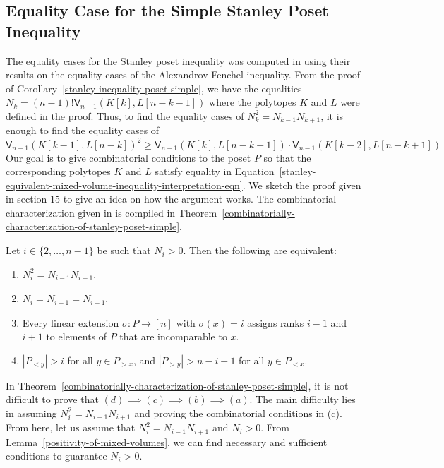 \documentclass{puthesis-UG}
\begin{document}
\subsection{Equality Case for the Simple Stanley Poset Inequality}

The equality cases for the Stanley poset inequality was computed in \cite{shenfeld2022extremals} using their results on the equality cases of the Alexandrov-Fenchel inequality. From the proof of Corollary~\ref{stanley-inequality-poset-simple}, we have the equalities $N_k = (n-1)! \mathsf{V}_{n-1} (K[k], L[n-k-1])$ where the polytopes $K$ and $L$ were defined in the proof. Thus, to find the equality cases of $N_k^2 = N_{k-1} N_{k+1}$, it is enough to find the equality cases of 
\begin{equation} \label{stanley-equivalent-mixed-volume-inequality-interpretation-eqn}
	\mathsf{V}_{n-1}(K[k-1], L[n-k])^2 \geq \mathsf{V}_{n-1}(K[k], L[n-k-1]) \cdot \mathsf{V}_{n-1}(K[k-2], L[n-k+1])
\end{equation}
Our goal is to give combinatorial conditions to the poset $P$ so that the corresponding polytopes $K$ and $L$ satisfy equality in Equation~\ref{stanley-equivalent-mixed-volume-inequality-interpretation-eqn}. We sketch the proof given in section 15 \cite{shenfeld2022extremals} to give an idea on how the argument works. The combinatorial characterization given in \cite{shenfeld2022extremals} is compiled in Theorem~\ref{combinatorially-characterization-of-stanley-poset-simple}. 

\begin{thm} \label{combinatorially-characterization-of-stanley-poset-simple}
	Let $i \in \{2, \ldots, n-1\}$ be such that $N_i > 0$. Then the following are equivalent:
	\begin{enumerate}[label = (\alph*)]
		\item $N_i^2 = N_{i-1} N_{i+1}$. 
		\item $N_i = N_{i-1} = N_{i+1}$. 
		\item Every linear extension $\sigma : P \to [n]$ with $\sigma(x) = i$ assigns ranks $i-1$ and $i+1$ to elements of $P$ that are incomparable to $x$. 
		\item $|P_{< y}| > i$ for all $y \in P_{> x}$, and $|P_{> y}| > n-i+1$ for all $y \in P_{< x}$. 
	\end{enumerate}
\end{thm}

In Theorem~\ref{combinatorially-characterization-of-stanley-poset-simple}, it is not difficult to prove that $(d)\implies(c)\implies(b)\implies(a)$. The main difficulty lies in assuming $N_i^2 = N_{i-1} N_{i+1}$ and proving the combinatorial conditions in (c). From here, let us assume that $N_i^2 = N_{i-1} N_{i+1}$ and $N_i > 0$. From Lemma~\ref{positivity-of-mixed-volumes}, we can find necessary and sufficient conditions to guarantee $N_i > 0$. 
\end{document}
